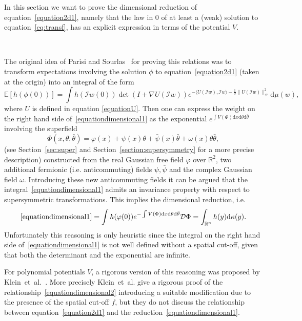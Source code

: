\documentclass[a4paper,10pt]{article}
\newcommand{\mathd}{\mathrm{d}}
\begin{document}
In this section we want to prove the dimensional reduction of
equation~{\eqref{equation2d1}}, namely that the law in 0 of at least a (weak)
solution to equation~{\eqref{eq:transf}}, has an explicit expression in terms
of the potential $V$.

\

The original idea of Parisi and Sourlas~{\cite{parisi_random_1979}} for
proving this relations was to transform expectations involving the solution
$\phi$ to equation~{\eqref{equation2d1}} (taken at the origin) into an
integral of the form
\begin{equation}
  \mathbb{E} [h (\phi (0))] = \int h (\mathcal{I}w (0)) \det (I + \nabla U
  (\mathcal{I}w)) e^{- \langle U (\mathcal{I}w), \mathcal{I}w \rangle -
  \frac{1}{2} \| U (\mathcal{I}w) \|^2_{\mathcal{H}}} \mathd \mu (w),
  \label{equationdimensional1}
\end{equation}
where $U$ is defined in equation {\eqref{equationU}}. Then one can express the
weight on the right hand side of~{\eqref{equationdimensional1}} as the
exponential $e^{\int V (\Phi) \mathd x \mathd \theta \mathd \bar{\theta}}$
involving the superfield
\[ \Phi (x, \theta, \bar{\theta}) = \varphi (x) + \psi (x) \theta + \bar{\psi}
   (x) \bar{\theta} + \omega (x) \theta \bar{\theta}, \]
(see Section~\ref{sec:super} and Section~\ref{section:supersymmetry} for a
more precise description) constructed from the real Gaussian free field
$\varphi$ over $\mathbb{R}^2$, two additional fermionic (i.e. anticommuting)
fields $\psi, \bar{\psi}$ and the complex Gaussian field $\omega$. Introducing
these new anticommuting fields it can be argued that the
integral~{\eqref{equationdimensional1}} admits an invariance property with
respect to supersymmetric transformations. This implies the dimensional
reduction, i.e.
\begin{equation}
  \eqref{equationdimensional1} = \int h (\varphi (0)) e^{- \int V
  (\Phi) \mathd x \mathd \theta \mathd \bar{\theta}} \mathcal{D} \Phi =
  \int_{\mathbb{R}^n} h (y) \mathd \kappa (y) . \label{equationdimensional2}
\end{equation}
Unfortunately this reasoning is only heuristic since the integral on the right
hand side of~{\eqref{equationdimensional1}} is not well defined without a
spatial cut-off, given that both the determinant and the exponential are
infinite.

For polynomial potentials $V$, a rigorous version of this reasoning was
proposed by Klein~et~al.~{\cite{Klein1984}}. More precisely Klein~et~al. give
a rigorous proof of the relationship~{\eqref{equationdimensional2}}
introducing a suitable modification due to the presence of the spatial cut-off
$f$, but they do not discuss the relationship between
equation~{\eqref{equation2d1}} and the
reduction~{\eqref{equationdimensional1}}.
\end{document}

